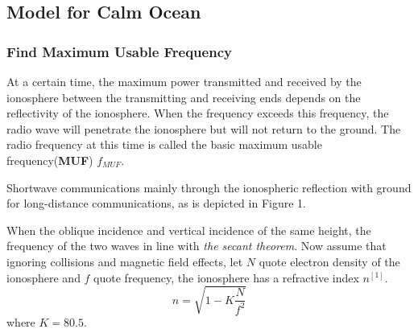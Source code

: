 \documentclass{mcmthesis}
\begin{document}
\subsection{Model for Calm Ocean}

\subsubsection{Find Maximum Usable Frequency}
 At a certain time, the maximum power transmitted and received by the ionosphere between the transmitting and receiving ends depends on the reflectivity of the ionosphere. When the frequency exceeds this frequency, the radio wave will penetrate the ionosphere but will not return to the ground. The radio frequency at this time is called the basic maximum usable frequency(\textbf{MUF}) $f_{MUF}$. 

Shortwave communications mainly through the ionospheric reflection with ground for long-distance communications, as is depicted in Figure 1. 

When the oblique incidence and vertical incidence of the same height, the frequency of the two waves in line with \textit{the secant theorem}. Now assume that ignoring collisions and magnetic field effects, let $N$ quote electron density of the ionosphere and $f$ quote frequency, the ionosphere has a refractive index $n$$^{[1]}$. 
\begin{equation}
n = \displaystyle\sqrt{1-K\displaystyle\frac{N}{f^2}}
\end{equation}
where $K=80.5$.
\end{document}
